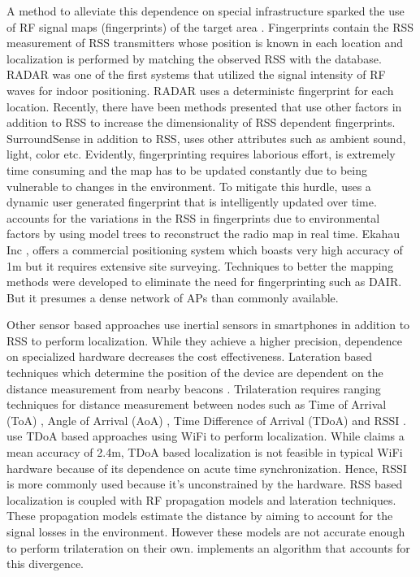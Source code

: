 \documentclass[twocolumn, 11pt]{IEEEtran}
\begin{document}
A method to alleviate this dependence on special infrastructure sparked the use of RF signal maps (fingerprints) of the target area \cite{kaemarungsi2012analysis, kaemarungsi2004RSSIproperties, badawy2007RSSidecision, zhang15}. 
Fingerprints contain the RSS measurement of RSS transmitters whose position is known in each location and localization is performed by matching the observed RSS with the database. 
RADAR \cite{bahl2000radar} was one of the first systems that utilized the signal intensity of RF waves for indoor positioning. RADAR uses a deterministc fingerprint for each location. 
Recently, there have been methods presented that use other factors in addition to RSS to increase the dimensionality of RSS dependent fingerprints. SurroundSense \cite{azizyan2009surroundsense} in addition to RSS, uses other attributes such as ambient sound, light, color etc. 
Evidently, fingerprinting requires laborious effort, is extremely time consuming and the map has to be updated constantly due to being vulnerable to changes in the environment. 
To mitigate this hurdle, \cite{ledlie2012mole} uses a dynamic user generated fingerprint that is intelligently updated over time. 
\cite{yin2008LEMT} accounts for the variations in the RSS in fingerprints due to environmental factors by using model trees to reconstruct the radio map in real time. 
Ekahau Inc \cite{ekahau}, offers a commercial positioning system which boasts very high accuracy of 1m but it requires extensive site surveying. 
Techniques to better the mapping methods were developed to eliminate the need for fingerprinting such as DAIR. But it presumes a dense network of APs than commonly available. 

Other sensor based approaches \cite{li2012Intertial1, qian2013Intertial2} use inertial sensors in smartphones in addition to RSS to perform localization. While they achieve a higher precision, dependence on specialized hardware decreases the cost effectiveness.
Lateration based techniques which determine the position of the device are dependent on the distance measurement from nearby beacons \cite{farid2013recent} .  Trilateration requires ranging techniques for distance measurement between nodes such as Time of Arrival (ToA) \cite{TOA}, Angle of Arrival (AoA) \cite{AOA}, Time Difference of Arrival (TDoA) and RSSI \cite{roxin2007survey}.  
\cite{li2000comparison, yamasaki2005tdoa, TDOA} use TDoA based approaches using WiFi to perform localization. While \cite{yamasaki2005tdoa} claims a mean accuracy of 2.4m, TDoA based localization is not feasible in typical WiFi hardware because of its dependence on acute time synchronization. Hence,
RSSI is more commonly used because it’s unconstrained by the hardware. RSS \cite{RSSI_Analysis,Analysis_RSSI} based localization  is coupled with RF propagation models and lateration techniques. These propagation models estimate the distance by aiming to account for the signal losses in the environment. However these models are not accurate enough to perform trilateration on their own. \cite{DCE} implements an algorithm that accounts for this divergence.
\end{document}
